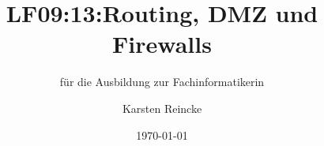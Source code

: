 \documentclass[]{beamer}
\title{LF09:13:Routing, DMZ und Firewalls}
\subtitle{für die Ausbildung zur Fachinformatikerin}
\institute[GS-LDK]{Gewerbliche Schulen Dillenburg}
\author{Karsten Reincke}
\date{\today}
\def\cfgGl{../../../cfg.gl/}
\begin{document}

\begin{frame}
  \titlepage

  
\end{frame}






\logo{}
\newpage



%
\end{document}
